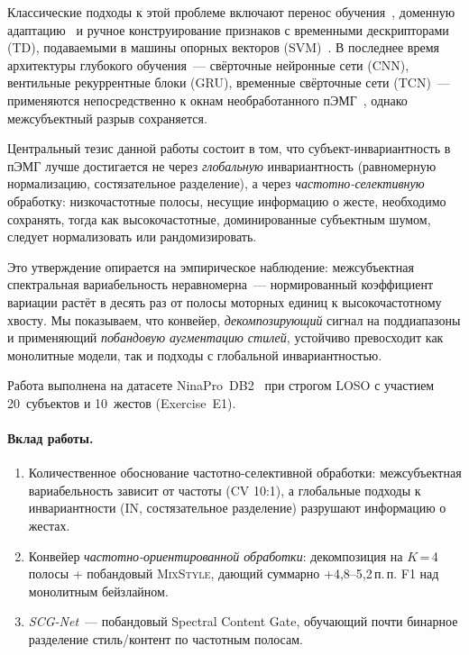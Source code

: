 \documentclass[conference]{IEEEtran}
\newcommand{\pp}{\,п.\,п.}
\newcommand{\mixstyle}{\textsc{MixStyle}}
\begin{document}
Классические подходы к этой проблеме включают перенос обучения~\cite{cote2019deep}, доменную адаптацию~\cite{du2017surface} и ручное конструирование признаков с временными дескрипторами (TD), подаваемыми в машины опорных векторов (SVM)~\cite{phinyomark2012feature}.
В последнее время архитектуры глубокого обучения~--- свёрточные нейронные сети (CNN), вентильные рекуррентные блоки (GRU), временные свёрточные сети (TCN)~--- применяются непосредственно к окнам необработанного пЭМГ~\cite{atzori2016deep, cote2019deep}, однако межсубъектный разрыв сохраняется.

Центральный тезис данной работы состоит в том, что субъект-инвариантность в пЭМГ лучше достигается не через \emph{глобальную} инвариантность (равномерную нормализацию, состязательное разделение), а через \emph{частотно-селективную} обработку: низкочастотные полосы, несущие информацию о жесте, необходимо сохранять, тогда как высокочастотные, доминированные субъектным шумом, следует нормализовать или рандомизировать.

Это утверждение опирается на эмпирическое наблюдение: межсубъектная спектральная вариабельность неравномерна~--- нормированный коэффициент вариации растёт в десять раз от полосы моторных единиц к высокочастотному хвосту.
Мы показываем, что конвейер, \emph{декомпозирующий} сигнал на поддиапазоны и применяющий \emph{побандовую аугментацию стилей}, устойчиво превосходит как монолитные модели, так и подходы с глобальной инвариантностью.

Работа выполнена на датасете NinaPro~DB2~\cite{atzori2014electromyography} при строгом LOSO с участием 20~субъектов и 10~жестов (Exercise~E1).

\paragraph{Вклад работы.}
\begin{enumerate}
    \item Количественное обоснование частотно-селективной обработки: межсубъектная вариабельность зависит от частоты (CV 10:1), а глобальные подходы к инвариантности (IN, состязательное разделение) разрушают информацию о жестах.
    \item Конвейер \emph{частотно-ориентированной обработки}: декомпозиция на $K$\,=\,4 полосы + побандовый \mixstyle{}, дающий суммарно +4,8--5,2\pp{} F1 над монолитным бейзлайном.
    \item \emph{SCG-Net}~--- побандовый Spectral Content Gate, обучающий почти бинарное разделение стиль/контент по частотным полосам.
\end{enumerate}
\end{document}
